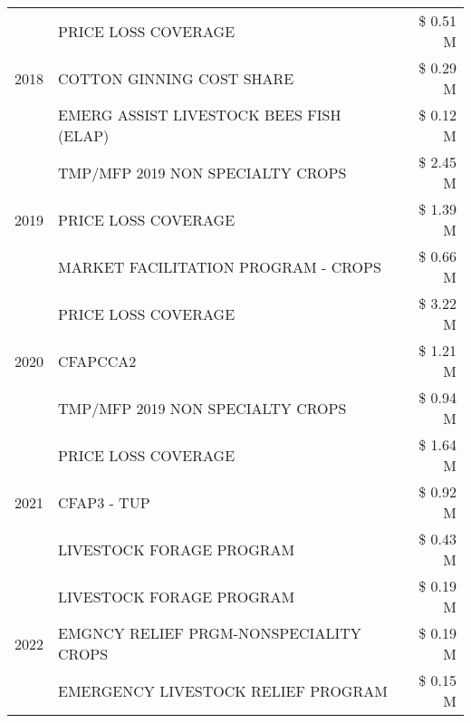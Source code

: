 \begin{tabular}{llr}
\multirow[t]{3}{*}{2018} & PRICE LOSS COVERAGE & \$ 0.51 M \\
 & COTTON GINNING COST SHARE & \$ 0.29 M \\
 & EMERG ASSIST LIVESTOCK BEES FISH (ELAP) & \$ 0.12 M \\
\cline{1-3}
\multirow[t]{3}{*}{2019} & TMP/MFP 2019 NON SPECIALTY CROPS & \$ 2.45 M \\
 & PRICE LOSS COVERAGE & \$ 1.39 M \\
 & MARKET FACILITATION PROGRAM - CROPS & \$ 0.66 M \\
\cline{1-3}
\multirow[t]{3}{*}{2020} & PRICE LOSS COVERAGE & \$ 3.22 M \\
 & CFAPCCA2 & \$ 1.21 M \\
 & TMP/MFP 2019 NON SPECIALTY CROPS & \$ 0.94 M \\
\cline{1-3}
\multirow[t]{3}{*}{2021} & PRICE LOSS COVERAGE & \$ 1.64 M \\
 & CFAP3 - TUP & \$ 0.92 M \\
 & LIVESTOCK FORAGE PROGRAM & \$ 0.43 M \\
\cline{1-3}
\multirow[t]{3}{*}{2022} & LIVESTOCK FORAGE PROGRAM & \$ 0.19 M \\
 & EMGNCY RELIEF PRGM-NONSPECIALITY CROPS & \$ 0.19 M \\
 & EMERGENCY LIVESTOCK RELIEF PROGRAM & \$ 0.15 M \\
\cline{1-3}
\bottomrule
\end{tabular}
